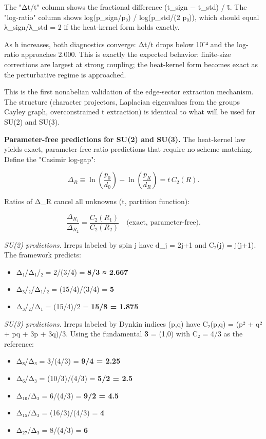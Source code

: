 The "Δt/t" column shows the fractional difference (t\_sign − t\_std) / \={t}. The "log-ratio" column shows log(p\_sign/p₀) / log(p\_std/(2 p₀)), which should equal λ\_sign/λ\_std = 2 if the heat-kernel form holds exactly.

As h increases, both diagnostics converge: Δt/t drops below 10⁻⁴ and the log-ratio approaches 2.000. This is exactly the expected behavior: finite-size corrections are largest at strong coupling; the heat-kernel form becomes exact as the perturbative regime is approached.

This is the first nonabelian validation of the edge-sector extraction mechanism. The structure (character projectors, Laplacian eigenvalues from the group\textquotesingle s Cayley graph, overconstrained t extraction) is identical to what will be used for SU(2) and SU(3).

\textbf{Parameter-free predictions for SU(2) and SU(3).} The heat-kernel law yields exact, parameter-free ratio predictions that require no scheme matching. Define the "Casimir log-gap":

\[
\Delta_R \equiv \ln\left(\frac{p_0}{d_0}\right) - \ln\left(\frac{p_R}{d_R}\right)
= t \, C_2(R).
\]

Ratios of Δ\_R cancel all unknowns (t, partition function):

\[
\frac{\Delta_{R_1}}{\Delta_{R_2}} = \frac{C_2(R_1)}{C_2(R_2)}
\quad \text{(exact, parameter-free).}
\]

\emph{SU(2) predictions.} Irreps labeled by spin j have d\_j = 2j+1 and C₂(j) = j(j+1). The framework predicts:

\begin{itemize}
\tightlist
\item
  Δ₁/Δ₁/₂ = 2/(3/4) = \textbf{8/3 ≈ 2.667}
\item
  Δ₃/₂/Δ₁/₂ = (15/4)/(3/4) = \textbf{5}
\item
  Δ₃/₂/Δ₁ = (15/4)/2 = \textbf{15/8 = 1.875}
\end{itemize}

\emph{SU(3) predictions.} Irreps labeled by Dynkin indices (p,q) have C₂(p,q) = (p² + q² + pq + 3p + 3q)/3. Using the fundamental \textbf{3} = (1,0) with C₂ = 4/3 as the reference:

\begin{itemize}
\tightlist
\item
  Δ₈/Δ₃ = 3/(4/3) = \textbf{9/4 = 2.25}
\item
  Δ₆/Δ₃ = (10/3)/(4/3) = \textbf{5/2 = 2.5}
\item
  Δ₁₀/Δ₃ = 6/(4/3) = \textbf{9/2 = 4.5}
\item
  Δ₁₅/Δ₃ = (16/3)/(4/3) = \textbf{4}
\item
  Δ₂₇/Δ₃ = 8/(4/3) = \textbf{6}
\end{itemize}

